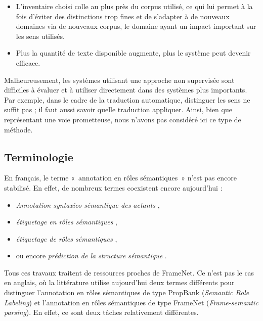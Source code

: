 \begin{itemize}

    \item L'inventaire choisi colle au plus près du corpus utilisé, ce qui lui
        permet à la fois d'éviter des distinctions trop fines et de s'adapter à
        de nouveaux domaines via de nouveaux corpus, le domaine ayant un impact
        important sur les sens utilisés.

    \item Plus la quantité de texte disponible augmente, plus le système peut
        devenir efficace.

\end{itemize}

Malheureusement, les systèmes utilisant une approche non supervisée sont
difficiles à évaluer et à utiliser directement dans des systèmes plus
importants. Par exemple, dans le cadre de la traduction automatique, distinguer
les sens ne suffit pas ; il faut aussi savoir quelle traduction appliquer.
Ainsi, bien que représentant une voie prometteuse, nous n'avons pas considéré
ici ce type de méthode.

\subsection{Terminologie}

En français, le terme «~annotation en rôles sémantiques~» n'est pas encore
stabilisé. En effet, de nombreux termes coexistent encore aujourd'hui :

\begin{itemize}
    \item \textit{Annotation syntaxico-sémantique des actants}
        \citep{hadouche2011annotation},
    \item \textit{étiquetage en rôles sémantiques} \citep{boros2014etiquetage},
    \item \textit{étiquetage de rôles sémantiques}
        \citep{lechelle2014utilisation},
    \item ou encore \textit{prédiction de la structure sémantique}
        \citep{michalon2014modelisation}.
\end{itemize}

Tous ces travaux traitent de ressources proches de FrameNet. Ce n'est pas le
cas en anglais, où la littérature utilise aujourd'hui deux termes différents
pour distinguer l'annotation en rôles sémantiques de type PropBank
(\textit{Semantic Role Labeling}) et l'annotation en rôles sémantiques de type
FrameNet (\textit{Frame-semantic parsing}). En effet, ce sont deux tâches
relativement différentes.

